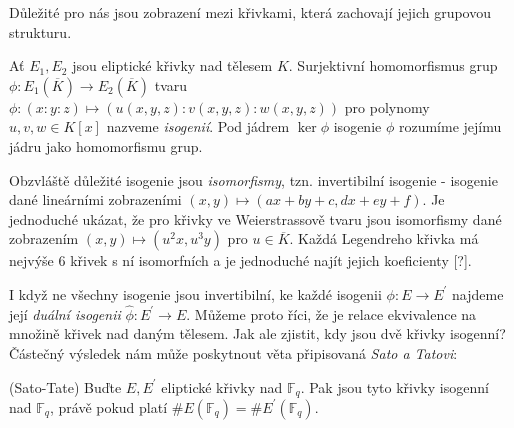\documentclass[12pt]{report}
\begin{document}
Důležité pro nás jsou zobrazení mezi křivkami, která zachovají jejich grupovou strukturu.

\begin{definice}
Ať $E_1,E_2$ jsou eliptické křivky nad tělesem $K$. Surjektivní homomorfismus grup $\phi: E_1(\overline{K}) \longrightarrow E_2(\overline{K})$ tvaru $\phi : (x:y:z) \longmapsto (u(x,y,z):v(x,y,z):w(x,y,z))$ pro polynomy $u,v,w \in K[x]$ nazveme \textit{isogenií}. Pod jádrem $\ker \phi$ isogenie $\phi$ rozumíme jejímu jádru jako homomorfismu grup. 
\end{definice}

Obzvláště důležité isogenie jsou \textit{isomorfismy}, tzn. invertibilní isogenie - isogenie dané lineárními zobrazeními $(x,y) \longmapsto (ax+by+c,dx+ey+f)$. Je jednoduché ukázat, že pro křivky ve Weierstrassově tvaru jsou isomorfismy dané zobrazením $(x,y) \longmapsto (u^2 x, u^3 y)$ pro $u \in \overline{K}$. Každá Legendreho křivka má nejvýše $6$ křivek s ní isomorfních a je jednoduché najít jejich koeficienty [?].

I když ne všechny isogenie jsou invertibilní, ke každé isogenii $\phi : E \longrightarrow E^{\prime}$ najdeme její \textit{duální isogenii} $\widehat{\phi} : E^{\prime} \longrightarrow E$. Můžeme proto říci, že  je relace ekvivalence na množině křivek nad daným tělesem. Jak ale zjistit, kdy jsou dvě křivky isogenní? Částečný výsledek nám může poskytnout věta připisovaná \textit{Sato a Tatovi}:
\begin{veta}\label{satotate} (Sato-Tate)
Buďte $E,E^\prime$ eliptické křivky nad $\mathbb{F}_q$. Pak jsou tyto křivky isogenní nad $\mathbb{F}_q$, právě pokud platí $\#E (\mathbb{F}_q) = \#E^\prime (\mathbb{F}_q)$.
\end{veta}
\end{document}
